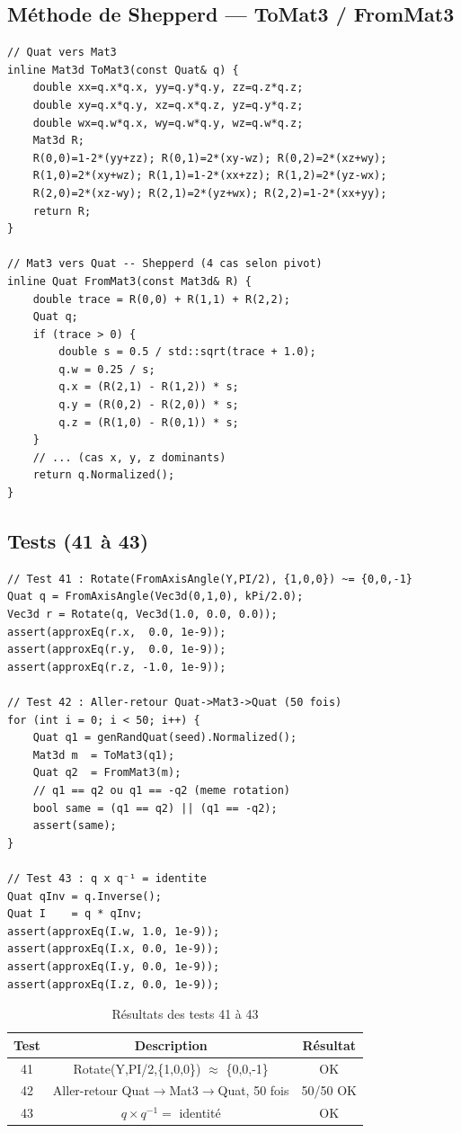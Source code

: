 \documentclass[12pt,a4paper]{report}
\begin{document}
\subsection{Méthode de Shepperd --- ToMat3 / FromMat3}

\begin{lstlisting}[caption={Quat.h --- ToMat3 et FromMat3}]
// Quat vers Mat3
inline Mat3d ToMat3(const Quat& q) {
    double xx=q.x*q.x, yy=q.y*q.y, zz=q.z*q.z;
    double xy=q.x*q.y, xz=q.x*q.z, yz=q.y*q.z;
    double wx=q.w*q.x, wy=q.w*q.y, wz=q.w*q.z;
    Mat3d R;
    R(0,0)=1-2*(yy+zz); R(0,1)=2*(xy-wz); R(0,2)=2*(xz+wy);
    R(1,0)=2*(xy+wz); R(1,1)=1-2*(xx+zz); R(1,2)=2*(yz-wx);
    R(2,0)=2*(xz-wy); R(2,1)=2*(yz+wx); R(2,2)=1-2*(xx+yy);
    return R;
}

// Mat3 vers Quat -- Shepperd (4 cas selon pivot)
inline Quat FromMat3(const Mat3d& R) {
    double trace = R(0,0) + R(1,1) + R(2,2);
    Quat q;
    if (trace > 0) {
        double s = 0.5 / std::sqrt(trace + 1.0);
        q.w = 0.25 / s;
        q.x = (R(2,1) - R(1,2)) * s;
        q.y = (R(0,2) - R(2,0)) * s;
        q.z = (R(1,0) - R(0,1)) * s;
    }
    // ... (cas x, y, z dominants)
    return q.Normalized();
}
\end{lstlisting}

\subsection{Tests (41 à 43)}

\begin{lstlisting}[caption={Tests Quaternions}]
// Test 41 : Rotate(FromAxisAngle(Y,PI/2), {1,0,0}) ~= {0,0,-1}
Quat q = FromAxisAngle(Vec3d(0,1,0), kPi/2.0);
Vec3d r = Rotate(q, Vec3d(1.0, 0.0, 0.0));
assert(approxEq(r.x,  0.0, 1e-9));
assert(approxEq(r.y,  0.0, 1e-9));
assert(approxEq(r.z, -1.0, 1e-9));

// Test 42 : Aller-retour Quat->Mat3->Quat (50 fois)
for (int i = 0; i < 50; i++) {
    Quat q1 = genRandQuat(seed).Normalized();
    Mat3d m  = ToMat3(q1);
    Quat q2  = FromMat3(m);
    // q1 == q2 ou q1 == -q2 (meme rotation)
    bool same = (q1 == q2) || (q1 == -q2);
    assert(same);
}

// Test 43 : q x q⁻¹ = identite
Quat qInv = q.Inverse();
Quat I    = q * qInv;
assert(approxEq(I.w, 1.0, 1e-9));
assert(approxEq(I.x, 0.0, 1e-9));
assert(approxEq(I.y, 0.0, 1e-9));
assert(approxEq(I.z, 0.0, 1e-9));
\end{lstlisting}

\begin{table}[H]
    \centering
    \begin{tabular}{|c|c|c|}
        \hline
        \textbf{Test} & \textbf{Description} & \textbf{Résultat} \\
        \hline
        41 & Rotate(Y,PI/2,\{1,0,0\}) $\approx$ \{0,0,-1\} & OK \\
        42 & Aller-retour Quat$\to$Mat3$\to$Quat, 50 fois & 50/50 OK \\
        43 & $q \times q^{-1} =$ identité & OK \\
        \hline
    \end{tabular}
    \caption{Résultats des tests 41 à 43}
\end{table}
\end{document}
